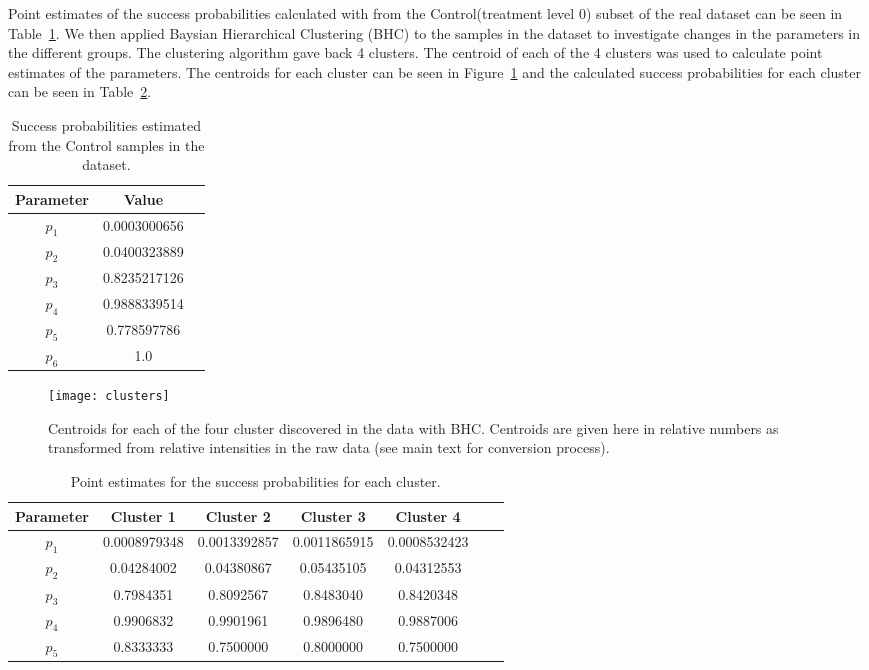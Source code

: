 Point estimates of the  success probabilities calculated with from the
Control(treatment level 0)
subset of the real dataset can be seen in
Table~\ref{tab:param_estimates}. We then applied Baysian Hierarchical
Clustering (BHC) to the samples in the dataset to investigate changes
in the parameters in the different groups. The clustering algorithm
gave back 4 clusters. The centroid of each of the 4 clusters was used
to calculate point estimates of the parameters. The centroids for each
cluster can be seen in Figure~\ref{fig:clusters} and the calculated
success probabilities for each cluster can be seen in
Table~\ref{tab:param_estimates_clusters}.

\begin{table}
\centering
    \begin{tabular}{ccc}
    Parameter & Value \\ \hline
    $p_1$ &  0.0003000656 \\
    $p_2$ & 0.0400323889\\
    $p_3$ &  0.8235217126\\
    $p_4$ &  0.9888339514\\
    $p_5$ &  0.778597786 \\
    $p_6$ &  1.0
    \end{tabular}
\caption{Success probabilities estimated from the Control samples in
  the dataset.}
\label{tab:param_estimates}
\end{table}

\begin{figure}[htbp!]
\centering
\texttt{[image: clusters]}
\caption[ML inverse problem formulation]{Centroids for each of the
  four cluster discovered in the data with BHC. Centroids are given
  here in relative numbers as transformed from relative intensities in
the raw data (see main text for conversion process).}
\label{fig:clusters}
\end{figure}

\begin{table}
\centering
    \begin{tabular}{ccccccc}
Parameter&  Cluster 1& Cluster 2& Cluster 3& Cluster 4 \\ \hline
$p_1$ & 0.0008979348 & 0.0013392857 & 0.0011865915& 0.0008532423 \\
$p_2$ & 0.04284002 & 0.04380867 & 0.05435105 & 0.04312553 \\
$p_3$ & 0.7984351 & 0.8092567 & 0.8483040 & 0.8420348 \\
$p_4$ &  0.9906832 & 0.9901961 & 0.9896480 & 0.9887006 \\
$p_5$ & 0.8333333 & 0.7500000 & 0.8000000 & 0.7500000 \\
\end{tabular}
\caption{Point estimates for the success probabilities for each cluster.}
\label{tab:param_estimates_clusters}
\end{table}





